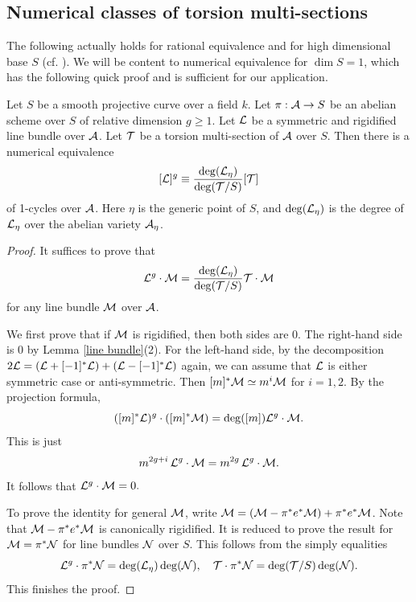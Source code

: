 \subsection{Numerical classes of torsion multi-sections}

The following actually holds for rational equivalence and for high dimensional base $S$ (cf. \cite[Theorem 2.1]{GZ2014}).
We will be content to numerical equivalence for $\dim S=1$, which has the following quick proof and is sufficient for our application.

\begin{pro} \label{numerical equivalent}
Let $S$ be a smooth projective curve over a field $k$.
Let $\pi:{\mathcal A}\to S$ be an abelian scheme over $S$ of relative dimension $g\geq 1$.
Let ${\mathcal L}$ be a symmetric and rigidified line bundle over ${\mathcal A}$.
Let ${\mathcal T}$ be a torsion multi-section of ${\mathcal A}$ over $S$.
Then there is a numerical equivalence
$$[{\mathcal L}]^g\equiv
\frac{\deg({\mathcal L}_\eta)}{\deg({\mathcal T}/S)} [{\mathcal T}]$$
of 1-cycles over ${\mathcal A}$.
Here $\eta$ is the generic point of $S$, and $\deg({\mathcal L}_\eta)$ is the degree of ${\mathcal L}_\eta$ over the abelian variety ${\mathcal A}_\eta$.
\end{pro}

\begin{proof}
It suffices to prove that
$${\mathcal L}^g\cdot {\mathcal M}=
\frac{\deg({\mathcal L}_\eta)}{\deg({\mathcal T}/S)} {\mathcal T}\cdot {\mathcal M}$$
for any line bundle ${\mathcal M}$ over ${\mathcal A}$.

We first prove that if ${\mathcal M}$ is rigidified, then both sides are 0.
The right-hand side is 0 by Lemma \ref{line bundle}(2).
For the left-hand side, by the decomposition $2{\mathcal L}=({\mathcal L}+[-1]^*{\mathcal L})+({\mathcal L}-[-1]^*{\mathcal L})$ again, we can assume that ${\mathcal L}$ is either symmetric case or anti-symmetric.
Then $[m]^*{\mathcal M}\simeq m^i{\mathcal M}$ for $i=1,2$.
By the projection formula,
$$([m]^*{\mathcal L})^g\cdot ([m]^*{\mathcal M})=
\deg([m]) {\mathcal L}^g\cdot {\mathcal M}.$$
This is just
$$m^{2g+i} \,{\mathcal L}^g\cdot {\mathcal M}=
m^{2g}\, {\mathcal L}^g\cdot {\mathcal M}.$$
It follows that ${\mathcal L}^g\cdot {\mathcal M}=0.$

To prove the identity for general ${\mathcal M}$, write ${\mathcal M}=({\mathcal M}-\pi^*e^*{\mathcal M})+\pi^*e^*{\mathcal M}$. Note that ${\mathcal M}-\pi^*e^*{\mathcal M}$ is canonically rigidified. It is reduced to prove the result for ${\mathcal M}=\pi^*{\mathcal N}$ for line bundles ${\mathcal N}$
over $S$. This follows from the simply equalities
$${\mathcal L}^g\cdot \pi^*{\mathcal N}=\deg({\mathcal L}_\eta)\deg({\mathcal N}),\quad
{\mathcal T}\cdot \pi^*{\mathcal N}=\deg({\mathcal T}/S)\deg({\mathcal N}).$$
This finishes the proof.
\end{proof}



